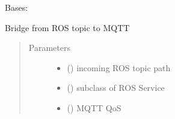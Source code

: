 \documentclass[letterpaper,10pt,english]{sphinxmanual}
\begin{document}
\begin{fulllineitems}
\label{\detokenize{source/mqtt_bridge/mqtt_bridge:mqtt_bridge.bridge.RosToMqttServiceBridge}}
Bases: {\hyperref[\detokenize{source/mqtt_bridge/mqtt_bridge:mqtt_bridge.bridge.Bridge}]{}}

Bridge from ROS topic to MQTT
\begin{quote}\begin{description}
\item[{Parameters}] \leavevmode\begin{itemize}
\item {} 
 () \textendash{} incoming ROS topic path

\item {} 
 () \textendash{} subclass of ROS Service

\item {} 
 () \textendash{} MQTT QoS

\end{itemize}

\end{description}\end{quote}

\begin{fulllineitems}
\label{\detokenize{source/mqtt_bridge/mqtt_bridge:mqtt_bridge.bridge.RosToMqttServiceBridge.is_service}}
\end{fulllineitems}


\end{fulllineitems}

\end{document}

